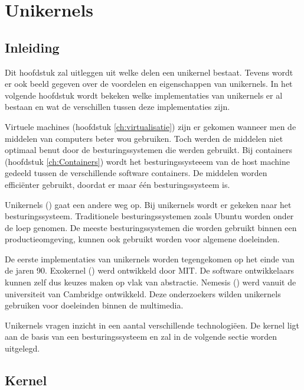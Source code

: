 \chapter{Unikernels}
\label{ch:unikernels}

\section{Inleiding}

Dit hoofdstuk zal uitleggen uit welke delen een unikernel bestaat. Tevens wordt er ook beeld gegeven over de voordelen en eigenschappen van unikernels. In het volgende hoofdstuk wordt bekeken welke implementaties van unikernels er al bestaan en wat de verschillen tussen deze implementaties zijn.

Virtuele machines (hoofdstuk \ref{ch:virtualisatie}) zijn er gekomen wanneer men de middelen van computers beter wou gebruiken. Toch werden de middelen niet optimaal benut door de besturingssystemen die werden gebruikt. Bij containers (hoofdstuk \ref{ch:Containers}) wordt het besturingssysteeem van de host machine gedeeld tussen de verschillende software containers. De middelen worden efficiënter gebruikt, doordat er maar één besturingssysteem is.

Unikernels (\cite{madhavapeddy_unikernels_2013}) gaat een andere weg op. Bij unikernels wordt er gekeken naar het besturingssysteem. Traditionele besturingssystemen zoals Ubuntu worden onder de loep genomen. De meeste besturingssystemen die worden gebruikt binnen een productieomgeving, kunnen ook gebruikt worden voor algemene doeleinden.

De eerste implementaties van unikernels worden tegengekomen op het einde van de jaren 90. Exokernel (\cite{mit_mit_1998}) werd ontwikkeld door MIT. De software ontwikkelaars kunnen zelf dus keuzes maken op vlak van abstractie. Nemesis (\cite{university_of_cambridge_nemesis_2000}) werd vanuit de universiteit van Cambridge ontwikkeld. Deze onderzoekers wilden unikernels gebruiken voor doeleinden binnen de multimedia.

Unikernels vragen inzicht in een aantal verschillende technologiëen. De kernel ligt aan de basis van een besturingssysteem en zal in de volgende sectie worden uitgelegd.

\section{Kernel}

